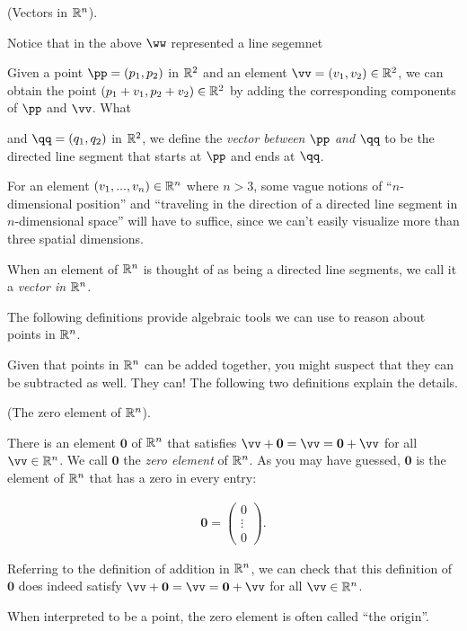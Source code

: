 \begin{deriv}
    (Vectors in $\mathbb{R}^n$).
    
    Notice that in the above $\ww$ represented a line segemnet
    
    Given a point $\pp = (p_1, p_2)$ in $\mathbb{R}^2$ and an element $\vv = (v_1, v_2) \in \R^2$, we can obtain the point $(p_1 + v_1, p_2 + v_2) \in \mathbb{R}^2$ by adding the corresponding components of $\pp$ and $\vv$. What
    
    
    and $\qq = (q_1, q_2)$ in $\mathbb{R}^2$, we define the \textit{vector between $\pp$ and $\qq$} to be the directed line segment that starts at $\pp$ and ends at $\qq$.
    
    
    For an element $(v_1, ..., v_n) \in \mathbb{R}^n$ where $n > 3$, some vague notions of ``$n$-dimensional position'' and ``traveling in the direction of a directed line segment in $n$-dimensional space'' will have to suffice, since we can't easily visualize more than three spatial dimensions.
    
    When an element of $\mathbb{R}^n$ is thought of as being a directed line segments, we call it a \textit{vector in $\mathbb{R}^n$}.
\end{deriv}


The following definitions provide algebraic tools we can use to reason about points in $\mathbb{R}^n$.



Given that points in $\mathbb{R}^n$ can be added together, you might suspect that they can be subtracted as well. They can! The following two definitions explain the details.

\begin{theorem}
    (The zero element of $\mathbb{R}^n$).
    
    There is an element $\mathbf{0}$ of $\mathbb{R}^n$ that satisfies $\vv + \mathbf{0} = \vv = \mathbf{0} + \vv$ for all $\vv \in \R^n$. We call $\textbf{0}$ the \textit{zero element} of $\mathbb{R}^n$. As you may have guessed, $\mathbf{0}$ is the element of $\mathbb{R}^n$ that has a zero in every entry:
    
    \begin{align*}
        \mathbf{0} = \begin{pmatrix} 0 \\ \vdots \\ 0 \end{pmatrix}.
    \end{align*}
    
    Referring to the definition of addition in $\mathbb{R}^n$, we can check that this definition of $\mathbf{0}$ does indeed satisfy $\vv + \mathbf{0} = \vv = \mathbf{0} + \vv$ for all $\vv \in \R^n$.
    
    When interpreted to be a point, the zero element is often called ``the origin''.
\end{theorem}

